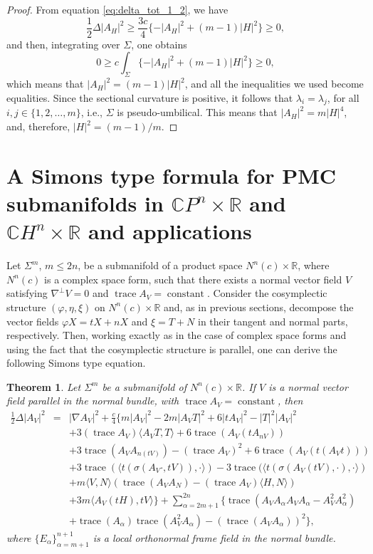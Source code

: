 \documentclass[11pt]{amsart}
\theoremstyle{plain}
\newtheorem{theorem}                {Theorem}      [section]
\theoremstyle{definition}
\DeclareMathOperator{\trace}{trace} \DeclareMathOperator{\di}{div}
\DeclareMathOperator{\cst}{constant}
\numberwithin{equation}{section}
\begin{document}
\begin{proof} From equation \eqref{eq:delta_tot_1_2}, we have
$$
\frac{1}{2}\Delta|A_H|^2\geq\frac{3c}{4}\{-|A_H|^2+(m-1)|H|^2\}\geq 0,
$$
and then, integrating over $\Sigma$, one obtains
$$
0\geq c\int_{\Sigma}\{-|A_H|^2+(m-1)|H|^2\}\geq 0,
$$
which means that $|A_H|^2=(m-1)|H|^2$, and all the inequalities we used become equalities. Since the sectional curvature is positive, it follows that $\lambda_i=\lambda_j$, for all $i,j\in\{1,2,\ldots,m\}$, i.e., $\Sigma$ is pseudo-umbilical. This means that $|A_H|^2=m|H|^4$, and, therefore, $|H|^2=(m-1)/m$.
\end{proof}

\section{A Simons type formula for PMC submanifolds in $\mathbb{C}P^n\times\mathbb{R}$ and $\mathbb{C}H^n\times\mathbb{R}$ and applications}

Let $\Sigma^m$, $m\leq 2n$, be a submanifold of a product space $N^n(c)\times\mathbb{R}$, where $N^n(c)$ is a complex space form, such that there exists a normal vector field $V$ satisfying $\nabla^{\perp}V=0$ and $\trace A_V=\cst$. Consider the cosymplectic structure $(\varphi,\eta,\xi)$ on $N^n(c)\times\mathbb{R}$ and, as in previous sections, decompose the vector fields $\varphi X=tX+nX$ and $\xi=T+N$ in their tangent and normal parts, respectively. Then, working exactly as in the case of complex space forms and using the fact that the cosymplectic structure is parallel, one can derive the following Simons type equation. 

\begin{theorem}\label{thm:delta2_prod}
Let $\Sigma^m$ be a submanifold of $N^n(c)\times\mathbb{R}$. If $V$ is a normal vector field parallel in the normal bundle, with $\trace A_V=\cst$, then
\begin{eqnarray}\label{eq:delta2_prod}
\frac{1}{2}\Delta|A_V|^2&=&|\nabla A_V|^2+\frac{c}{4}\{m|A_V|^2-2m|A_VT|^2+6|tA_V|^2-|T|^2|A_V|^2\\\nonumber &&+3(\trace A_V)\langle A_VT,T\rangle+6\trace(A_V(tA_{nV}))\\\nonumber &&+3\trace(A_VA_{n(tV)})-(\trace A_V)^2+6\trace(A_V(t(A_Vt)))\\\nonumber &&+3\trace(\langle t(\sigma(A_V\cdot,tV)),\cdot\rangle)-3\trace(\langle t(\sigma(A_V(tV),\cdot),\cdot\rangle)\\\nonumber &&+m\langle V,N\rangle(\trace(A_VA_N)-(\trace A_V)\langle H,N\rangle)\\\nonumber&&+3m\langle A_V(tH),tV\rangle\}+\sum_{\alpha=2m+1}^{2n}\{\trace(A_VA_{\alpha}A_VA_{\alpha}-A_V^2A_{\alpha}^2)\\\nonumber &&+\trace(A_{\alpha})\trace(A_V^2A_{\alpha})-(\trace(A_VA_{\alpha}))^2\},
\end{eqnarray}
where $\{E_{\alpha}\}_{\alpha=m+1}^{n+1}$ is a local orthonormal frame field in the normal bundle.
\end{theorem}
\end{document}
